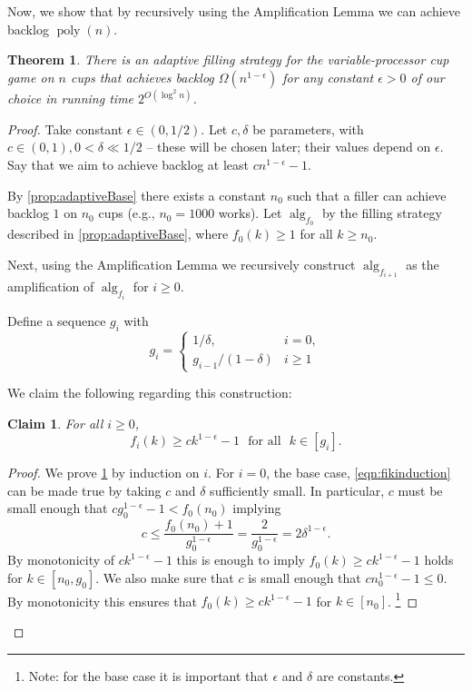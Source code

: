 \documentclass[twocolumn]{article}[10pt]
\DeclareMathOperator{\poly}{\text{poly}}
\DeclareMathOperator{\alg}{\text{alg}}
\newtheorem{clm}{Claim}
\newtheorem{theorem}{Theorem}
\begin{document}
Now, we show that by recursively using the Amplification Lemma we
can achieve backlog $\poly(n)$.
\begin{theorem}
  \label{thm:adaptivePoly}
  There is an adaptive filling strategy for the variable-processor cup game on
  $n$ cups that achieves backlog $\Omega(n^{1-\epsilon})$ for any constant
  $\epsilon > 0$ of our choice in running time $2^{O(\log^2 n)}$.
\end{theorem}
\begin{proof}
  Take constant $\epsilon \in (0,1/2)$. Let $c, \delta$ be
  parameters, with $c\in (0,1), 0 < \delta \ll 1/2$ -- these will
  be chosen later; their values depend on $\epsilon$.
  Say that we aim to achieve backlog at least $cn^{1-\epsilon}-1$.

  By \cref{prop:adaptiveBase} there exists a constant
  $n_0$ such that a filler can achieve backlog $1$
  on $n_0$ cups (e.g., $n_0 = 1000$ works). Let $\alg_{f_0}$ by the filling strategy
  described in \cref{prop:adaptiveBase}, where $f_0(k)
  \ge 1$ for all $k\ge n_0$. 

  Next, using the Amplification Lemma we recursively construct
  $\alg_{f_{i+1}}$ as the amplification of $\alg_{f_{i}}$ for $i\ge 0$. 

  Define a sequence $g_i$ with 
  $$ g_i = \begin{cases}
    1/\delta,  & i = 0,\\
    g_{i-1}/(1-\delta) & i \ge 1
  \end{cases} $$

  We claim the following regarding this construction:
  \begin{clm}
    \label{clm:fikinduction}
    For all $i\ge0$,
    \begin{equation}
      f_i(k) \ge ck^{1-\epsilon}-1\,\, \text{ for all }\,\, k\in [g_{i}].
    \label{eqn:fikinduction}
    \end{equation}
  \end{clm}
  \begin{proof}
  We prove \cref{clm:fikinduction} by induction on $i$.
  For $i=0$, the base case, \eqref{eqn:fikinduction} can
  be made true by taking $c$ and $\delta$ sufficiently small.
  In particular, $c$ must be small enough
  that $cg_0^{1-\epsilon} -1 < f_0(n_0)$ implying 
  $$c \le \frac{f_0(n_0)+1}{g_0^{1-\epsilon}} = \frac{2}{g_0^{1-\epsilon}} = 2\delta^{1-\epsilon}.$$
  By monotonicity of $ck^{1-\epsilon}-1$ this is enough to imply
  $f_0(k) \ge ck^{1-\epsilon} -1$ holds
  for $k\in [n_0, g_0]$. We also make sure that $c$ is small
  enough that $c n_0^{1-\epsilon} -1 \le 0$. By
  monotonicity this ensures that $f_0(k) \ge ck^{1-\epsilon}
  -1$ for $k \in [n_0]$.
  \footnote{Note: for the base case it is important that
  $\epsilon$ and $\delta$ are constants.}


\end{proof}
\end{proof}
\end{document}
